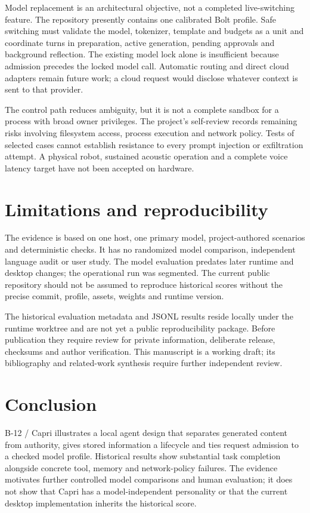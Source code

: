 \documentclass[11pt]{article}
\begin{document}
Model replacement is an architectural objective, not a completed live-switching feature. The repository presently contains one calibrated Bolt profile. Safe switching must validate the model, tokenizer, template and budgets as a unit and coordinate turns in preparation, active generation, pending approvals and background reflection. The existing model lock alone is insufficient because admission precedes the locked model call. Automatic routing and direct cloud adapters remain future work; a cloud request would disclose whatever context is sent to that provider.

The control path reduces ambiguity, but it is not a complete sandbox for a process with broad owner privileges. The project's self-review records remaining risks involving filesystem access, process execution and network policy. Tests of selected cases cannot establish resistance to every prompt injection or exfiltration attempt. A physical robot, sustained acoustic operation and a complete voice latency target have not been accepted on hardware.

\section{Limitations and reproducibility}
The evidence is based on one host, one primary model, project-authored scenarios and deterministic checks. It has no randomized model comparison, independent language audit or user study. The model evaluation predates later runtime and desktop changes; the operational run was segmented. The current public repository should not be assumed to reproduce historical scores without the precise commit, profile, assets, weights and runtime version.

The historical evaluation metadata and JSONL results reside locally under the runtime worktree and are not yet a public reproducibility package. Before publication they require review for private information, deliberate release, checksums and author verification. This manuscript is a working draft; its bibliography and related-work synthesis require further independent review.

\section{Conclusion}
B-12 / Capri illustrates a local agent design that separates generated content from authority, gives stored information a lifecycle and ties request admission to a checked model profile. Historical results show substantial task completion alongside concrete tool, memory and network-policy failures. The evidence motivates further controlled model comparisons and human evaluation; it does not show that Capri has a model-independent personality or that the current desktop implementation inherits the historical score.
\end{document}
